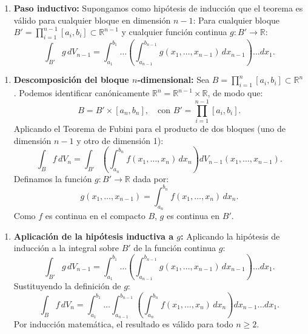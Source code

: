 \documentclass[11pt,a4paper]{article}
\begin{document}
\begin{enumerate}[label=\textbf{\arabic*.}]
\item \textbf{Paso inductivo:}
Supongamos como hipótesis de inducción que el teorema es válido para cualquier bloque en dimensión $n-1$:
Para cualquier bloque $B' = \prod_{i=1}^{n-1} [a_i, b_i] \subset \mathbb{R}^{n-1}$ y cualquier función continua $g: B' \to \mathbb{R}$:
\begin{equation*}
\int_{B'} g \, dV_{n-1} = \int_{a_1}^{b_1} \dots \left( \int_{a_{n-1}}^{b_{n-1}} g(x_1, \dots, x_{n-1}) \, dx_{n-1} \right) \dots dx_1.
\end{equation*}
\end{enumerate}

\begin{enumerate}[label=\textbf{\arabic*.}]
\item \textbf{Descomposición del bloque $n$-dimensional:}
Sea $B = \prod_{i=1}^n [a_i, b_i] \subset \mathbb{R}^n$.
Podemos identificar canónicamente $\mathbb{R}^n = \mathbb{R}^{n-1} \times \mathbb{R}$, de modo que:
\begin{equation*}
B = B' \times [a_n, b_n], \quad \text{con } B' = \prod_{i=1}^{n-1} [a_i, b_i].
\end{equation*}
Aplicando el Teorema de Fubini para el producto de dos bloques (uno de dimensión $n-1$ y otro de dimensión 1):
\begin{equation*}
\int_B f \, dV_n = \int_{B'} \left( \int_{a_n}^{b_n} f(x_1, \dots, x_n) \, dx_n \right) dV_{n-1}(x_1, \dots, x_{n-1}).
\end{equation*}
Definamos la función $g: B' \to \mathbb{R}$ dada por:
\begin{equation*}
g(x_1, \dots, x_{n-1}) = \int_{a_n}^{b_n} f(x_1, \dots, x_n) \, dx_n.
\end{equation*}
Como $f$ es continua en el compacto $B$, $g$ es continua en $B'$.
\end{enumerate}

\begin{enumerate}[label=\textbf{\arabic*.}]
\item \textbf{Aplicación de la hipótesis inductiva a $g$:}
Aplicando la hipótesis de inducción a la integral sobre $B'$ de la función continua $g$:
\begin{equation*}
\int_{B'} g \, dV_{n-1} = \int_{a_1}^{b_1} \dots \left( \int_{a_{n-1}}^{b_{n-1}} g(x_1, \dots, x_{n-1}) \, dx_{n-1} \right) \dots dx_1.
\end{equation*}
Sustituyendo la definición de $g$:
\begin{equation*}
\int_B f \, dV_n = \int_{a_1}^{b_1} \dots \int_{a_{n-1}}^{b_{n-1}} \left( \int_{a_n}^{b_n} f(x_1, \dots, x_n) \, dx_n \right) dx_{n-1} \dots dx_1.
\end{equation*}
Por inducción matemática, el resultado es válido para todo $n \ge 2$.
\end{enumerate}
\end{document}
